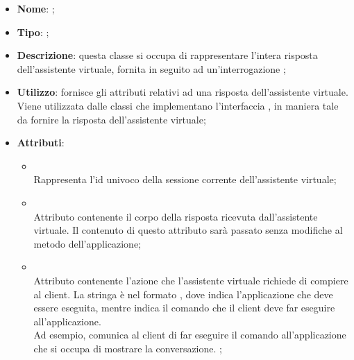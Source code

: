 \begin{itemize}
	\item \textbf{Nome}: ;
	\item \textbf{Tipo}: ;
	\item \textbf{Descrizione}: questa classe si occupa di rappresentare l'intera risposta dell'assistente virtuale, fornita in seguito ad un'interrogazione ;
	\item \textbf{Utilizzo}: fornisce gli attributi relativi ad una risposta dell'assistente virtuale. Viene utilizzata dalle classi che implementano l'interfaccia , in maniera tale da fornire la risposta dell'assistente virtuale;
	\item \textbf{Attributi}:
	\begin{itemize}
		\item[]  \\
		Rappresenta l'id univoco della sessione corrente dell'assistente virtuale;
		\item[]  \\
		Attributo contenente il corpo della risposta ricevuta dall'assistente virtuale. Il contenuto di questo attributo sarà passato senza modifiche al metodo  dell'applicazione;
		\item[]  \\
		Attributo contenente l'azione che l'assistente virtuale richiede di compiere al client. La stringa è nel formato , dove  indica l'applicazione che deve essere eseguita, mentre  indica il comando che il client deve far eseguire all'applicazione. \\
Ad esempio,  comunica al client di far eseguire il comando  all'applicazione che si occupa di mostrare la conversazione.  ;
	\end{itemize}
\end{itemize}

